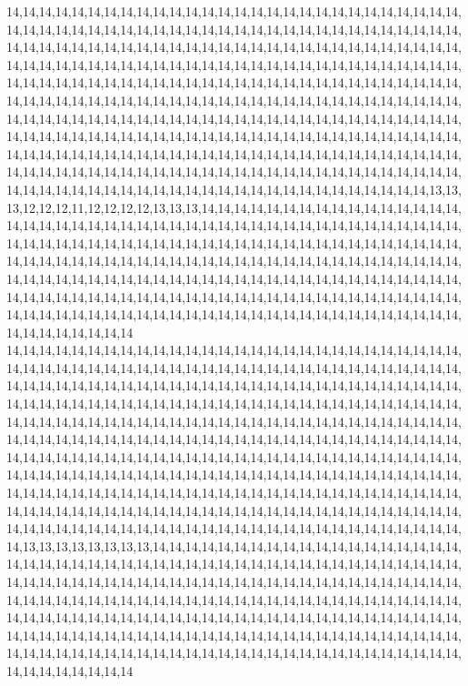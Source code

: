 14,14,14,14,14,14,14,14,14,14,14,14,14,14,14,14,14,14,14,14,14,14,14,14,14,14,14,14,14,14,14,14,14,14,14,14,14,14,14,14,14,14,14,14,14,14,14,14,14,14,14,14,14,14,14,14,14,14,14,14,14,14,14,14,14,14,14,14,14,14,14,14,14,14,14,14,14,14,14,14,14,14,14,14,14,14,14,14,14,14,14,14,14,14,14,14,14,14,14,14,14,14,14,14,14,14,14,14,14,14,14,14,14,14,14,14,14,14,14,14,14,14,14,14,14,14,14,14,14,14,14,14,14,14,14,14,14,14,14,14,14,14,14,14,14,14,14,14,14,14,14,14,14,14,14,14,14,14,14,14,14,14,14,14,14,14,14,14,14,14,14,14,14,14,14,14,14,14,14,14,14,14,14,14,14,14,14,14,14,14,14,14,14,14,14,14,14,14,14,14,14,14,14,14,14,14,14,14,14,14,14,14,14,14,14,14,14,14,14,14,14,14,14,14,14,14,14,14,14,14,14,14,14,14,14,14,14,14,14,14,14,14,14,14,14,14,14,14,14,14,14,14,14,14,14,14,14,14,14,14,14,14,14,14,14,14,14,14,14,14,14,14,14,14,14,14,14,14,14,14,14,14,14,14,14,14,14,14,14,14,14,14,14,14,14,14,14,14,14,14,14,14,14,14,14,14,13,13,13,12,12,12,11,12,12,12,12,13,13,13,14,14,14,14,14,14,14,14,14,14,14,14,14,14,14,14,14,14,14,14,14,14,14,14,14,14,14,14,14,14,14,14,14,14,14,14,14,14,14,14,14,14,14,14,14,14,14,14,14,14,14,14,14,14,14,14,14,14,14,14,14,14,14,14,14,14,14,14,14,14,14,14,14,14,14,14,14,14,14,14,14,14,14,14,14,14,14,14,14,14,14,14,14,14,14,14,14,14,14,14,14,14,14,14,14,14,14,14,14,14,14,14,14,14,14,14,14,14,14,14,14,14,14,14,14,14,14,14,14,14,14,14,14,14,14,14,14,14,14,14,14,14,14,14,14,14,14,14,14,14,14,14,14,14,14,14,14,14,14,14,14,14,14,14,14,14,14,14,14,14,14,14,14,14,14,14,14,14,14,14,14,14,14,14,14,14,14,14,14,14,14,14
14,14,14,14,14,14,14,14,14,14,14,14,14,14,14,14,14,14,14,14,14,14,14,14,14,14,14,14,14,14,14,14,14,14,14,14,14,14,14,14,14,14,14,14,14,14,14,14,14,14,14,14,14,14,14,14,14,14,14,14,14,14,14,14,14,14,14,14,14,14,14,14,14,14,14,14,14,14,14,14,14,14,14,14,14,14,14,14,14,14,14,14,14,14,14,14,14,14,14,14,14,14,14,14,14,14,14,14,14,14,14,14,14,14,14,14,14,14,14,14,14,14,14,14,14,14,14,14,14,14,14,14,14,14,14,14,14,14,14,14,14,14,14,14,14,14,14,14,14,14,14,14,14,14,14,14,14,14,14,14,14,14,14,14,14,14,14,14,14,14,14,14,14,14,14,14,14,14,14,14,14,14,14,14,14,14,14,14,14,14,14,14,14,14,14,14,14,14,14,14,14,14,14,14,14,14,14,14,14,14,14,14,14,14,14,14,14,14,14,14,14,14,14,14,14,14,14,14,14,14,14,14,14,14,14,14,14,14,14,14,14,14,14,14,14,14,14,14,14,14,14,14,14,14,14,14,14,14,14,14,14,14,14,14,14,14,14,14,14,14,14,14,14,14,14,14,14,14,14,14,14,14,14,14,14,14,14,14,14,14,14,14,14,14,14,14,14,14,14,14,14,14,14,14,14,14,14,14,14,13,13,13,13,13,13,13,13,14,14,14,14,14,14,14,14,14,14,14,14,14,14,14,14,14,14,14,14,14,14,14,14,14,14,14,14,14,14,14,14,14,14,14,14,14,14,14,14,14,14,14,14,14,14,14,14,14,14,14,14,14,14,14,14,14,14,14,14,14,14,14,14,14,14,14,14,14,14,14,14,14,14,14,14,14,14,14,14,14,14,14,14,14,14,14,14,14,14,14,14,14,14,14,14,14,14,14,14,14,14,14,14,14,14,14,14,14,14,14,14,14,14,14,14,14,14,14,14,14,14,14,14,14,14,14,14,14,14,14,14,14,14,14,14,14,14,14,14,14,14,14,14,14,14,14,14,14,14,14,14,14,14,14,14,14,14,14,14,14,14,14,14,14,14,14,14,14,14,14,14,14,14,14,14,14,14,14,14,14,14,14,14,14,14,14,14,14,14,14,14,14,14,14

